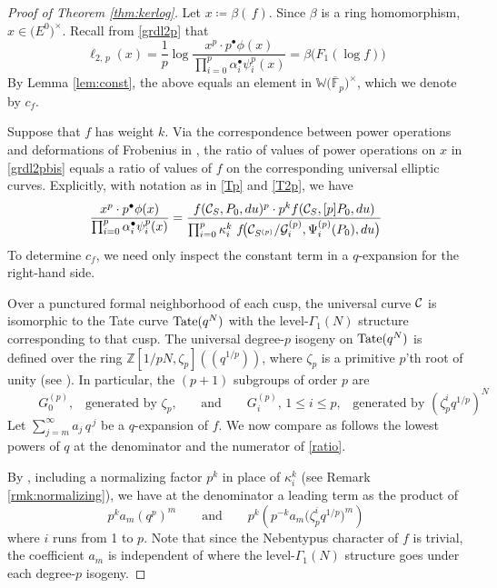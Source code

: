 \documentclass{gtpart}
\theoremstyle{definition}
\theoremstyle{remark}
\newcommand{\mb}[1]{\mathbb{#1}}
\newcommand{\cF}{\overline {\mb F}}
\newcommand{\CC}{{\cal C}}
\newcommand{\CG}{{\cal G}}
\newcommand{\BW}{{\mb W}}
\newcommand{\BZ}{{\mb Z}}
\newcommand{\ad}{\text{and}}
\newcommand{\A}{\alpha}
\newcommand{\B}{\beta}
\newcommand{\G}{\Gamma}
\newcommand{\K}{\kappa}
\newcommand{\ce}{\coloneqq}
\newcommand{\lp}{(\!(}
\newcommand{\rp}{)\!)}
\renewcommand{\=}{\approx}
\renewcommand{\-}{\sim}
\newcommand{\Tate}{{\rm Tate}}
\numberwithin{equation}{section}
\numberwithin{thm}{section}
\begin{document}
\begin{proof}[Proof of Theorem \ref{thm:kerlog}]
 Let $x \ce \B(\,f)$.  Since $\B$ is a ring homomorphism, 
 $x \in \big( E^0 \big)^{\!\times}$.  Recall from \eqref{grdl2p} that 
 \begin{equation}
  \label{grdl2pbis}
  \ell_{2,\,p}(x) = \frac{1}{p} \log 
  \frac{x^p \cdot p^\bullet \phi(x)}{\prod_{i=0}^p \A_i^\bullet \psi^p_i(x)} = 
  \B \big( F_1(\log f) \big) 
 \end{equation}
 By Lemma \ref{lem:const}, the above equals an element in 
 $\BW \big( \cF_p \big)^{\!\times}$, which we denote by $c_f$.  

 Suppose that $f$ has weight $k$.  Via the correspondence between power 
 operations and deformations of Frobenius in \cite[Theorem B]{cong}, the ratio 
 of values of power operations on $x$ in \eqref{grdl2pbis} equals a ratio of 
 values of $f$ on the corresponding universal elliptic curves.  Explicitly, with 
 notation as in \eqref{Tp} and \eqref{T2p}, we have 
 \begin{equation}
  \label{ratio}
  \frac{x^p \cdot p^\bullet \phi(x)}{\prod_{i=0}^p \A_i^\bullet \psi^p_i(x)} = 
  \frac{f(\CC_S, P_0, du)^p \cdot p^k f(\CC_S, [p] P_0, du)}{\prod_{i=0}^p 
  \K_i^k ~ f\!\big(\CC_{S^{(p)}}/\CG^{(p)}_i, \Psi^{(p)}_i(P_0), du\big)} 
 \end{equation}
 To determine $c_f$, we need only inspect the constant term in a $q$-expansion 
 for the right-hand side.  

 Over a punctured formal neighborhood of each cusp, the universal curve $\CC$ is 
 isomorphic to the Tate curve $\Tate(q^N)$ with the level-$\G_1(N)$ structure 
 corresponding to that cusp.  The universal degree-$p$ isogeny on $\Tate(q^N)$ 
 is defined over the ring $\BZ [1/pN, \zeta_p] \lp q^{1/p} \rp$, where $\zeta_p$ 
 is a primitive $p$'th root of unity (see 
 \cite[Sections 1.2, 1.4, and 1.11]{padicprop}).  In particular, the $(p + 1)$ 
 subgroups of order $p$ are 
 \[
  \qquad~~ \text{$G^{(p)}_0$,~~~generated by $\zeta_p$,} \qquad \ad \qquad 
  \text{$G^{(p)}_i$, $1 \leq i \leq p$,~~~generated by $(\zeta_p^i q^{1/p})^N$} 
 \]
 Let $\sum_{j = m}^\infty a_j \, q^{\,j}$ be a $q$-expansion of $f$.  We now 
 compare as follows the lowest powers of $q$ at the denominator and the 
 numerator of \eqref{ratio}.  

 By \cite[(1.11.0.3) and (1.11.0.4)]{padicprop}, including a normalizing factor 
 $p^k$ in place of $\K_i^k$ (see Remark \ref{rmk:normalizing}), we have at the 
 denominator a leading term as the product of 
 \[
  p^k a_m (q^p)^m \qquad \ad \qquad p^k \left( p^{-k} a_m \big( \zeta_p^i 
  q^{1/p} \big)^m \right) 
 \]
 where $i$ runs from 1 to $p$.  Note that since the Nebentypus character of $f$ 
 is trivial, the coefficient $a_m$ is independent of where the level-$\G_1(N)$ 
 structure goes under each degree-$p$ isogeny.  


\end{proof}
\end{document}
